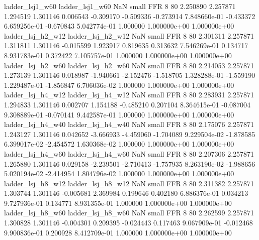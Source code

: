          ladder_lsj1_w60          ladder_lsj1_w60                   NaN      small      FFR                 8 80 2.250890       2.257871 1.294519       1.301146    0.006543     -0.309170     -0.509336    -0.273914   7.848660e-01 -0.433372 6.659256e-01    -0.670843   5.042774e-01            1.000000    1.000000e+00        1.000000e+00
       ladder_lsj_h2_w12        ladder_lsj_h2_w12                   NaN      small      FFR                 8 80 2.301311       2.257871 1.311811       1.301146   -0.015599      1.923917      0.819635     0.313632   7.546269e-01  0.134717 8.931783e-01     0.372422   7.105757e-01            1.000000    1.000000e+00        1.000000e+00
       ladder_lsj_h2_w60        ladder_lsj_h2_w60                   NaN      small      FFR                 8 80 2.214053       2.257871 1.273139       1.301146    0.018987     -1.940661     -2.152476    -1.518705   1.328288e-01 -1.559190 1.229487e-01    -1.856847   6.706036e-02            1.000000    1.000000e+00        1.000000e+00
       ladder_lsj_h4_w12        ladder_lsj_h4_w12                   NaN      small      FFR                 8 80 2.283931       2.257871 1.294833       1.301146    0.002707      1.154188     -0.485210     0.207104   8.364615e-01 -0.087004 9.308889e-01    -0.070141   9.442587e-01            1.000000    1.000000e+00        1.000000e+00
       ladder_lsj_h4_w40        ladder_lsj_h4_w40                   NaN      small      FFR                 8 80 2.175076       2.257871 1.243127       1.301146    0.042652     -3.666933     -4.459060    -1.704089   9.229504e-02 -1.878585 6.399017e-02    -2.454572   1.630368e-02            1.000000    1.000000e+00        1.000000e+00
       ladder_lsj_h4_w60        ladder_lsj_h4_w60                   NaN      small      FFR                 8 80 2.207306       2.257871 1.265880       1.301146    0.029158     -2.239501     -2.710413    -1.757935   8.263190e-02 -1.988656 5.020194e-02    -2.414954   1.804796e-02            1.000000    1.000000e+00        1.000000e+00
       ladder_lsj_h8_w12        ladder_lsj_h8_w12                   NaN      small      FFR                 8 80 2.311382       2.257871 1.303744       1.301146   -0.005681      2.369984      0.199646     0.402180   6.886376e-01  0.034213 9.727936e-01     0.134771   8.931355e-01            1.000000    1.000000e+00        1.000000e+00
       ladder_lsj_h8_w60        ladder_lsj_h8_w60                   NaN      small      FFR                 8 80 2.262599       2.257871 1.300828       1.301146   -0.004301      0.209395     -0.024443     0.117463   9.067909e-01 -0.012468 9.900836e-01     0.200928   8.412709e-01            1.000000    1.000000e+00        1.000000e+00
